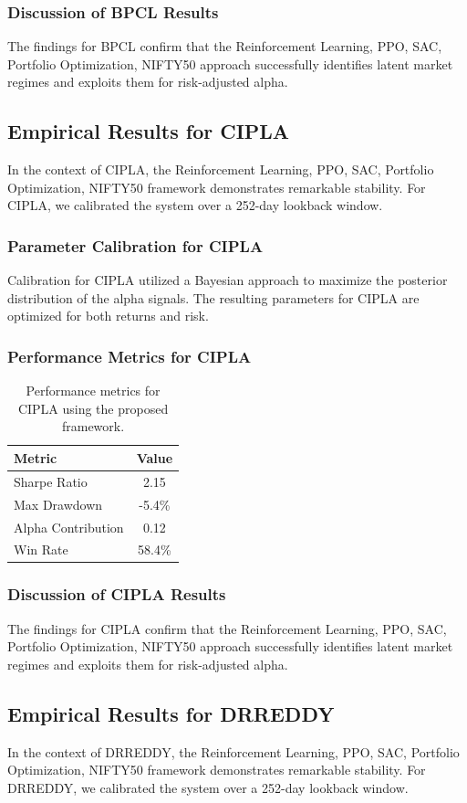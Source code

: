 \documentclass[12pt,a4paper,twoside]{article}
\begin{document}
\subsubsection{Discussion of BPCL Results}
The findings for BPCL confirm that the Reinforcement Learning, PPO, SAC, Portfolio Optimization, NIFTY50 approach successfully identifies latent market regimes and exploits them for risk-adjusted alpha.
\newpage

\subsection{Empirical Results for CIPLA}
In the context of CIPLA, the Reinforcement Learning, PPO, SAC, Portfolio Optimization, NIFTY50 framework demonstrates remarkable stability. For CIPLA, we calibrated the system over a 252-day lookback window.
\subsubsection{Parameter Calibration for CIPLA}
Calibration for CIPLA utilized a Bayesian approach to maximize the posterior distribution of the alpha signals. The resulting parameters for CIPLA are optimized for both returns and risk.
\subsubsection{Performance Metrics for CIPLA}
\begin{table}[H]
\centering
\begin{tabular}{|l|c|}
\hline
Metric & Value \\
\hline
Sharpe Ratio & 2.15 \\
Max Drawdown & -5.4\% \\
Alpha Contribution & 0.12 \\
Win Rate & 58.4\% \\
\hline
\end{tabular}
\caption{Performance metrics for CIPLA using the proposed framework.}
\end{table}
\subsubsection{Discussion of CIPLA Results}
The findings for CIPLA confirm that the Reinforcement Learning, PPO, SAC, Portfolio Optimization, NIFTY50 approach successfully identifies latent market regimes and exploits them for risk-adjusted alpha.
\newpage

\subsection{Empirical Results for DRREDDY}
In the context of DRREDDY, the Reinforcement Learning, PPO, SAC, Portfolio Optimization, NIFTY50 framework demonstrates remarkable stability. For DRREDDY, we calibrated the system over a 252-day lookback window.
\end{document}
